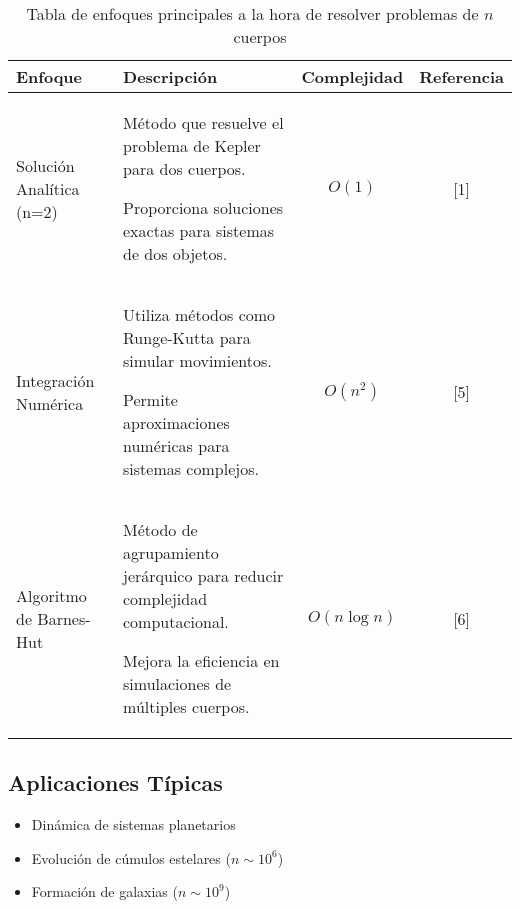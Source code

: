 \begin{table}[H]
    \centering
    \caption[Enfoques en $n$ cuerpos]{\small Tabla de enfoques principales a la hora de resolver problemas de $n$ cuerpos}%
    \label{tab:EnfoquesNCuerpos}
    \begin{adjustbox}{max width=\linewidth}
        \begin{tabular}{@{}p{}p{}cc@{}}
            \toprule
            \textbf{Enfoque} & \textbf{Descripción} & \textbf{Complejidad} & \textbf{Referencia} \\
            \midrule
            Solución Analítica (n=2) & 
            Método que resuelve el problema de Kepler para dos cuerpos.
            
            Proporciona soluciones exactas para sistemas de dos objetos. & 
            $O(1)$ & [1] \\
            \midrule
            Integración Numérica & 
            Utiliza métodos como Runge-Kutta para simular movimientos.
            
            Permite aproximaciones numéricas para sistemas complejos. & 
            $O(n^2)$ & [5] \\
            \midrule
            Algoritmo de Barnes-Hut & 
            Método de agrupamiento jerárquico para reducir complejidad computacional.
            
            Mejora la eficiencia en simulaciones de múltiples cuerpos. & 
            $O(n \log n)$ & [6] \\
            \bottomrule
        \end{tabular}
    \end{adjustbox}
\end{table}

\subsection{Aplicaciones Típicas}
\begin{itemize}
    \item Dinámica de sistemas planetarios
    \item Evolución de cúmulos estelares ($n \sim 10^6$)
    \item Formación de galaxias ($n \sim 10^9$)
\end{itemize}

